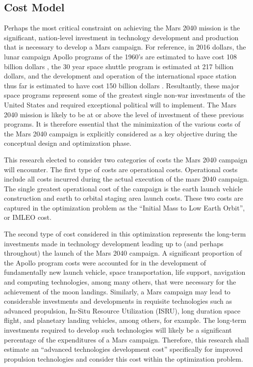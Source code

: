 \documentclass[]{aiaa-pretty}
\begin{document}
\subsection{Cost Model}
Perhaps the most critical constraint on achieving the Mars 2040 mission is the significant, nation-level investment in technology development and production that is necessary to develop a Mars campaign. For reference, in 2016 dollars, the lunar campaign Apollo programs of the 1960’s are estimated to have cost 108 billion dollars \cite{stine2008crs}, the 30 year space shuttle program is estimated at 217 billion dollars, and the development and operation of the international space station thus far is estimated to have cost 150 billion dollars \cite{lafleur2010costs}. Resultantly, these major space programs represent some of the greatest single non-war investments of the United States and required exceptional political will to implement. The Mars 2040 mission is likely to be at or above the level of investment of these previous programs. It is therefore essential that the minimization of the various costs of the Mars 2040 campaign is explicitly considered as a key objective during the conceptual design and optimization phase.

This research elected to consider two categories of costs the Mars 2040 campaign will encounter. The first type of costs are operational costs. Operational costs include all costs incurred during the actual execution of the mars 2040 campaign. The single greatest operational cost of the campaign is the earth launch vehicle construction and earth to orbital staging area launch costs. These two costs are captured in the optimization problem as the “Initial Mass to Low Earth Orbit”, or IMLEO cost. 

The second type of cost considered in this optimization represents the long-term investments made in technology development leading up to (and perhaps throughout) the launch of the Mars 2040 campaign. A significant proportion of the Apollo program costs were accounted for in the development of fundamentally new launch vehicle, space transportation, life support, navigation and computing technologies, among many others, that were necessary for the achievement of the moon landings. Similarly, a Mars campaign may lead to considerable investments and developments in requisite technologies such as advanced propulsion, In-Situ Resource Utilization (ISRU), long duration space flight, and planetary landing vehicles, among others, for example. The long-term investments required to develop such technologies will likely be a significant percentage of the expenditures of a Mars campaign. Therefore, this research shall estimate an “advanced technologies development cost” specifically for improved propulsion technologies and consider this cost within the optimization problem. 
\end{document}
